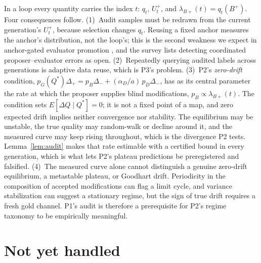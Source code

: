 \documentclass[11pt]{article}
\theoremstyle{definition}
\theoremstyle{remark}
\begin{document}
In a loop every quantity carries the index $t$: $q_t$, $U^+_t$, and $\lambda_{B+}(t)=q_t(B^+)$. Four consequences follow.
(1)~Audit samples must be redrawn from the current generation's $U^+_t$, because selection changes $q_t$. Reusing a fixed anchor measures the anchor's distribution, not the loop's; this is the second weakness we expect in anchor-gated evaluator promotion \cite{rqgm2026}, and the survey \cite{duan2026} lists detecting coordinated proposer--evaluator errors as open.
(2)~Repeatedly querying audited labels across generations is adaptive data reuse, which is P3's problem.
(3)~P2's \emph{zero-drift} condition, $p_G(Q^*)\Delta_+=p_B\Delta_-+(\alpha_D/a)\,p_D\Delta_-$, has as its central parameter the rate at which the proposer supplies blind modifications, $p_B\propto\lambda_{B+}(t)$. The condition sets $E[\Delta Q\mid Q^*]=0$; it is not a fixed point of a map, and zero expected drift implies neither convergence nor stability. The equilibrium may be unstable, the true quality may random-walk or decline around it, and the measured curve may keep rising throughout, which is the divergence P2 tests. Lemma~\ref{lem:audit} makes that rate estimable with a certified bound in every generation, which is what lets P2's plateau predictions be preregistered and falsified.
(4)~The measured curve alone cannot distinguish a genuine zero-drift equilibrium, a metastable plateau, or Goodhart drift. Periodicity in the composition of accepted modifications can flag a limit cycle, and variance stabilization can suggest a stationary regime, but the sign of true drift requires a fresh gold channel. P1's audit is therefore a prerequisite for P2's regime taxonomy to be empirically meaningful.

\section{Not yet handled}\label{sec:open}
\end{document}
